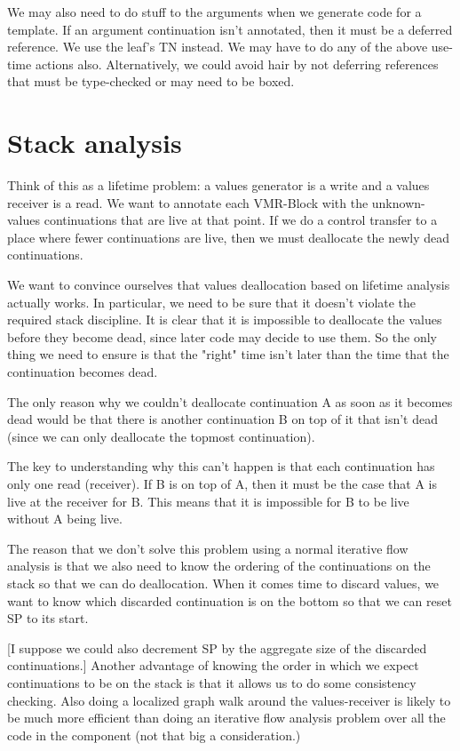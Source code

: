 We may also need to do stuff to the arguments when we generate code for a
template.  If an argument continuation isn't annotated, then it must be a
deferred reference.  We use the leaf's TN instead.  We may have to do any of
the above use-time actions also.  Alternatively, we could avoid hair by not
deferring references that must be type-checked or may need to be boxed.


\section{Stack analysis}

Think of this as a lifetime problem: a values generator is a write and a values
receiver is a read.  We want to annotate each VMR-Block with the unknown-values
continuations that are live at that point.  If we do a control transfer to a
place where fewer continuations are live, then we must deallocate the newly
dead continuations.

We want to convince ourselves that values deallocation based on lifetime
analysis actually works.  In particular, we need to be sure that it doesn't
violate the required stack discipline.  It is clear that it is impossible to
deallocate the values before they become dead, since later code may decide to
use them.  So the only thing we need to ensure is that the "right" time isn't
later than the time that the continuation becomes dead.

The only reason why we couldn't deallocate continuation A as soon as it becomes
dead would be that there is another continuation B on top of it that isn't dead
(since we can only deallocate the topmost continuation).

The key to understanding why this can't happen is that each continuation has
only one read (receiver).  If B is on top of A, then it must be the case that A
is live at the receiver for B.  This means that it is impossible for B to be
live without A being live.


The reason that we don't solve this problem using a normal iterative flow
analysis is that we also need to know the ordering of the continuations on the
stack so that we can do deallocation.  When it comes time to discard values, we
want to know which discarded continuation is on the bottom so that we can reset
SP to its start.  

[I suppose we could also decrement SP by the aggregate size of the discarded
continuations.]  Another advantage of knowing the order in which we expect
continuations to be on the stack is that it allows us to do some consistency
checking.  Also doing a localized graph walk around the values-receiver is
likely to be much more efficient than doing an iterative flow analysis problem
over all the code in the component (not that big a consideration.)



